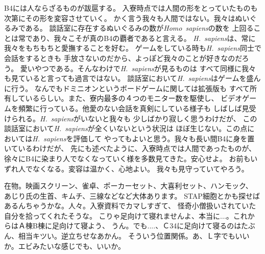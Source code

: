 \vspace{7mm}


B4には人ならざるものが跋扈する。
入寮時点では人間の形をとっていたものも次第にその形を変容させていく。
かく言う我々も人間ではない。我々はぬいぐるみである。
談話室に存在するぬいぐるみの数が\textit{Homo}\ \textit{sapiens}の数を
上回ることは常であり、我々こそが真のB4の覇者であると言える。
\textit{H.}\ \textit{sapiens}は、常に我々をもちもちと愛撫することを好む。
ゲームをしている時も\textit{H.}\ \textit{sapiens}同士で会話をするときも
手放さないのだから、よっぽど我々のことが好きなのだろう。
愛いやつである。そんなわけで\textit{H.}\ \textit{sapiens}が見るものは
すべて同様に我々も見ていると言っても過言ではない。
談話室において\textit{H.}\ \textit{sapiens}はゲームを盛んに行う。
なんでもドミニオンというボードゲームに関しては拡張版も
すべて所有しているらしい。また、寮内最多の４つのモニター数を駆使し、
ビデオゲームを頻繁に行っている。他愛のない会話を真剣にしている様子も
しばしば見受けられる。\textit{H.}\ \textit{sapiens}がいないと我々も
少しばかり寂しく思うわけだが、
この談話室において\textit{H.}\ \textit{sapiens}が全くいないという状況は
ほぼ生じない。この点においては\textit{H.}\ \textit{sapiens}を評価して
やってもよいと思う。我々も長い間B4に身を置いているわけだが、
先にも述べたように、入寮時点では人間であったものが、
徐々にB4に染まり人でなくなっていく様を多数見てきた。安心せよ。
お前もいずれ人でなくなる。変容は温かく、心地よい。
我々も見守っていてやろう。

\vspace{7mm}


在物。映画スクリーン、雀卓、ポーカーセット、大喜利セット、ハンモック、
あじり氏の生首、キムチ、三線などなど大体あります。
STAP細胞とかも探せばあるんちゃうかな。人々。入寮資料でカマしすぎて、
怪奇小僧扱いされていた自分を拾ってくれたそうな。
こりゃ足向けて寝れませんよ、本当に...。これからはＡ棟B棟に足向けて寝よう、
うん。でも....、Ｃ34に足向けて寝るのはたぶん、相当キツい。逆立ちせなあかん。
そういう位置関係。あ、Ｌ字でもいいか。エビみたいな感じでも、いいか。

\vspace{7mm}


